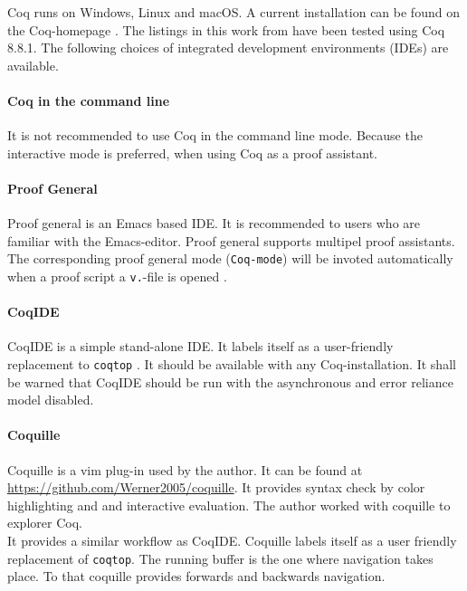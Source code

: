Coq runs on Windows, Linux and macOS.
A current installation can be found on the Coq-homepage \cite{Coq}. 
The listings in this work from \cite{PACGGHSY} have been tested using Coq 8.8.1.
The following choices of integrated development environments (IDEs) are available. 


\paragraph{Coq in the command line}
\label{par:CoqInTheCommandLine}

It is not recommended to use Coq in the command line mode. 
Because the interactive mode is preferred, when using Coq as a proof assistant. 


\paragraph{Proof General}
\label{par:proofGeneral}

Proof general is an Emacs based IDE. 
It is recommended to users who are familiar with the Emacs-editor.
Proof general supports multipel proof assistants. 
The corresponding proof general mode (\lstinline!Coq-mode!) will be invoted automatically when a proof script a \lstinline!v.!-file is opened \cite{PROOFGENERAL}. 


\paragraph{CoqIDE}
\label{par:CoqIDE}

CoqIDE is a simple stand-alone IDE. 
It labels itself as a user-friendly replacement to \lstinline!coqtop! \cite{COQIDE}.   
It should be available with any Coq-installation. 
It shall be warned that CoqIDE should be run with the asynchronous and error reliance model disabled. 

\paragraph{Coquille}
\label{par:Coquille}

Coquille is a vim plug-in used by the author.
It can be found at \url{https://github.com/Werner2005/coquille}.
It provides syntax check by color highlighting and and interactive evaluation.  
The author worked with coquille to explorer Coq.\\
It provides a similar workflow as CoqIDE. 
Coquille labels itself as a user friendly  replacement of \lstinline!coqtop!. 
The running buffer is the one where navigation takes place. 
To that coquille provides forwards and backwards navigation.\\


